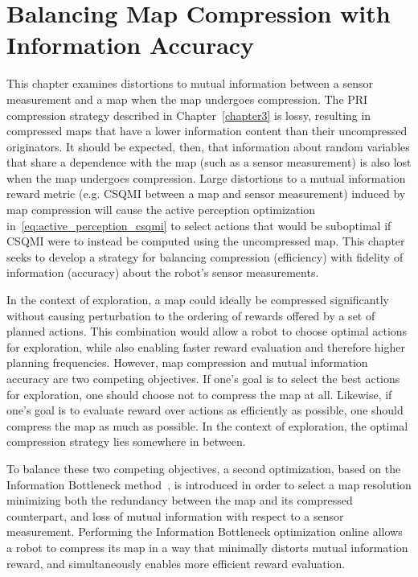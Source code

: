 \chapter{Balancing Map Compression with Information Accuracy}
\label{chapter4}

This chapter examines distortions to mutual information between a sensor
measurement and a map when the map undergoes compression. The PRI
compression strategy described in Chapter~\ref{chapter3} is lossy, resulting in
compressed maps that have a lower information content than their uncompressed
originators. It should be expected, then, that information about
random variables that share a dependence with the map (such as a sensor measurement) is also lost
when the map undergoes compression. Large distortions to a mutual information reward metric
(e.g. CSQMI between a map and sensor measurement) induced by map compression will cause the active perception optimization
in~\eqref{eq:active_perception_csqmi} to select actions that would be suboptimal
if CSQMI were to instead be computed using the uncompressed map. This chapter
seeks to develop a strategy for balancing compression (efficiency) with fidelity of information
(accuracy) about the robot's sensor measurements.

In the context of exploration, a map could ideally be compressed significantly
without causing perturbation to the ordering of rewards offered by a set of planned
actions. This combination would allow a robot to choose optimal actions for
exploration, while also enabling faster reward evaluation and therefore higher
planning frequencies. However, map compression and mutual information accuracy
are two competing objectives. If one's goal is to select the best actions for
exploration, one should choose not to compress the map at all. Likewise, if one's
goal is to evaluate reward over actions as efficiently as possible, one should
compress the map as much as possible. In the context of exploration, the optimal
compression strategy lies somewhere in between.

To balance these two competing objectives, a second
optimization, based on the Information Bottleneck
method~\cite{tishby2000information}, is introduced in order to select a map
resolution minimizing both the redundancy between the map and its compressed counterpart,
and loss of mutual information with respect to a sensor measurement. Performing
the Information Bottleneck optimization online allows a robot to compress its map in a way that
minimally distorts mutual information reward, and simultaneously enables more
efficient reward evaluation.

